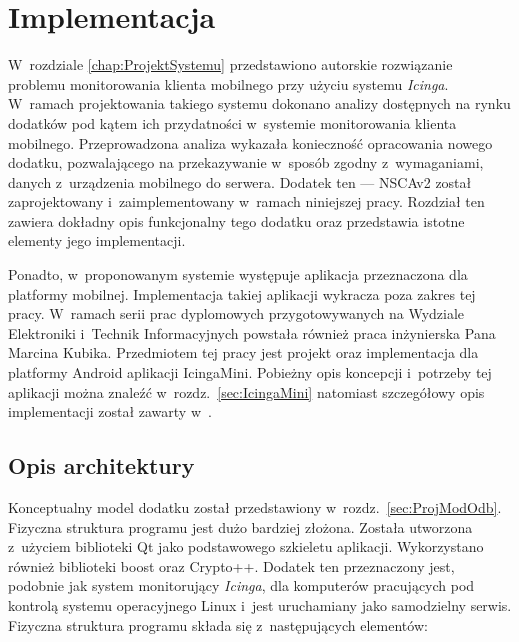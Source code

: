 \chapter{Implementacja}
\label{chap:Implementacja}

W~rozdziale \ref{chap:ProjektSystemu} przedstawiono autorskie
rozwiązanie problemu monitorowania klienta mobilnego przy użyciu
systemu {\em Icinga}. W~ramach projektowania takiego systemu dokonano
analizy dostępnych na rynku dodatków pod kątem ich przydatności
w~systemie monitorowania klienta mobilnego. Przeprowadzona analiza
wykazała konieczność opracowania nowego dodatku, pozwalającego na
przekazywanie w~sposób zgodny z~wymaganiami, danych z~urządzenia
mobilnego do serwera.  Dodatek ten --- NSCAv2 został zaprojektowany
i~zaimplementowany w~ramach niniejszej pracy. Rozdział ten zawiera
dokładny opis funkcjonalny tego dodatku oraz przedstawia istotne
elementy jego implementacji.

Ponadto, w~proponowanym systemie występuje aplikacja przeznaczona dla
platformy mobilnej. Implementacja takiej aplikacji wykracza poza
zakres tej pracy.  W~ramach serii prac dyplomowych przygotowywanych na
Wydziale Elektroniki i~Technik Informacyjnych powstała również praca
inżynierska Pana Marcina Kubika. Przedmiotem tej pracy jest projekt
oraz implementacja dla platformy Android aplikacji
IcingaMini. Pobieżny opis koncepcji i~potrzeby tej aplikacji można
znaleźć w~rozdz.~\ref{sec:IcingaMini} natomiast szczegółowy opis
implementacji został zawarty w~\cite{book:pracaKubika}.

\section[Opis architektury][Opis architektury]{Opis architektury}


Konceptualny model dodatku został przedstawiony
w~rozdz.~\ref{sec:ProjModOdb}. Fizyczna struktura programu jest dużo
bardziej złożona. Została utworzona z~użyciem biblioteki Qt jako
podstawowego szkieletu aplikacji. Wykorzystano również biblioteki
boost oraz Crypto++. Dodatek ten przeznaczony jest, podobnie jak
system monitorujący {\em Icinga}, dla komputerów pracujących pod
kontrolą systemu operacyjnego Linux i~jest uruchamiany jako
samodzielny serwis. Fizyczna struktura programu składa się
z~następujących elementów:


